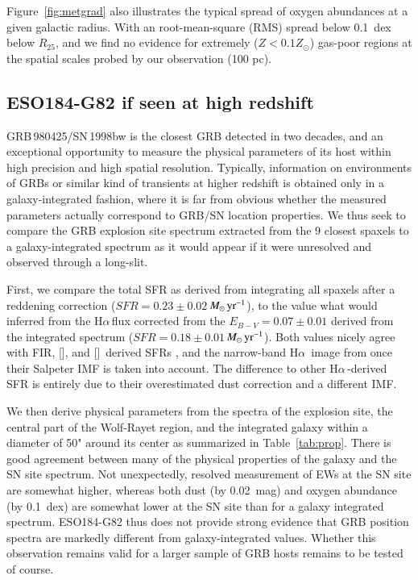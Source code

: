 \documentclass[traditabstract]{aa}
\newcommand{\ha}{H$\alpha$}
\newcommand{\oi}{[\ion{O}{i}]}
\newcommand{\cii}{[\ion{C}{ii}]}
\newcommand{\Msunyr}{$M_\odot\,\rm{yr}^{-1}$}
\begin{document}
Figure~\ref{fig:metgrad} also illustrates the typical spread of oxygen abundances at a given galactic radius. With an root-mean-square (RMS) spread below 0.1~dex below $R_{25}$, and we find no evidence for extremely ($Z < 0.1 Z_\odot$) gas-poor regions at the spatial scales probed by our observation (100 pc). 

\subsection{ESO184-G82 if seen at high redshift}


GRB\,980425/SN\,1998bw is the closest GRB detected in two decades, and an exceptional opportunity to measure the physical parameters of its host within high precision and high spatial resolution. Typically, information on environments of GRBs or similar kind of transients  at higher redshift is obtained only in a galaxy-integrated fashion\citep{2015A&A...581A.125K, 2016A&A...590A.129J}, where it is far from obvious whether the measured parameters actually correspond to GRB/SN location properties. We thus seek to compare the GRB explosion site spectrum extracted from the 9 closest spaxels to a galaxy-integrated spectrum as it would appear if it were unresolved and observed through a long-slit. 

First, we compare the total SFR as derived from integrating all spaxels after a reddening correction ($SFR=0.23\pm0.02$\,\Msunyr), to the value what would inferred from the \ha\,flux corrected from the $E_{B-V}=0.07\pm0.01$ derived from the integrated spectrum ($SFR=0.18\pm0.01$\,\Msunyr). Both values nicely agree with FIR, \oi, and \cii\, derived SFRs \citep{2014A&A...562A..70M, 2016arXiv160901742M}, and the narrow-band \ha\, image from \citet{2005NewA...11..103S} once their Salpeter IMF is taken into account. The difference to other \ha\,-derived SFR \citep{2006A&A...454..103H, 2008A&A...490...45C} is entirely due to their overestimated dust correction and a different IMF.

We then derive physical parameters from the spectra of the explosion site, the central part of the Wolf-Rayet region, and the integrated galaxy within a diameter of 50" around its center as summarized in Table~\ref{tab:prop}. There is good agreement between many of the physical properties of the galaxy and the SN site spectrum. Not unexpectedly, resolved measurement of EWs at the SN site are somewhat higher, whereas both dust (by 0.02~mag) and oxygen abundance (by 0.1~dex) are somewhat lower at the SN site than for a galaxy integrated spectrum. ESO184-G82 thus does not provide strong evidence that GRB position spectra are markedly different from galaxy-integrated values. Whether this observation remains valid for a larger sample of GRB hosts remains to be tested of course.
\end{document}
